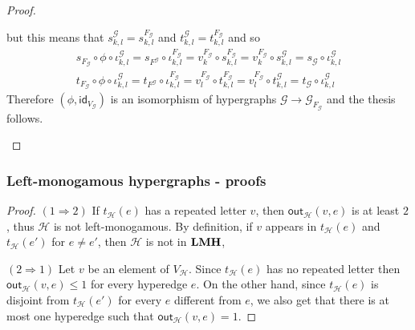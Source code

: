 \documentclass[3p]{elsarticle}
\newcommand{\outd}[1]{\mathsf{out}_{\mathcal{#1}}}
\newcommand{\catname}[1]{\textbf{\textup{#1}}}
\newcommand{\lmo}{\catname{LMH}}
\newcommand{\id}[1]{\mathsf{id}_{#1}}
\theoremstyle{remark}
\theoremstyle{definition}
\begin{document}
\begin{proof}
\begin{itemize}
	but this means that $s^{\mathcal{G}}_{k,l}= s^{F_{\mathcal{G}}}_{k,l}$ and 
$t^{\mathcal{G}}_{k,l}= t^{F_{\mathcal{G}}}_{k,l}$ and so
\begin{gather*}
s_{F_{\mathcal{G}}}\circ \phi \circ \iota^{\mathcal{G}}_{k,l}=  s_{F^{\mathcal{G}}}\circ \iota^{F_{\mathcal{G}}}_{k,l}= v^{F_{\mathcal{G}}}_k \circ s^{F_{\mathcal{G}}}_{k,l} = v^{F_{\mathcal{G}}}_k \circ  s^{\mathcal{G}}_{k,l} = s_{\mathcal{G}}\circ \iota^{\mathcal{G}}_{k,l}\\
t_{F_{\mathcal{G}}}\circ \phi \circ \iota^{\mathcal{G}}_{k,l}=  t_{F^{\mathcal{G}}}\circ \iota^{F_{\mathcal{G}}}_{k,l}= v^{F_{\mathcal{G}}}_l \circ t^{F_{\mathcal{G}}}_{k,l} = v^{F_{\mathcal{G}}}_l \circ  t^{\mathcal{G}}_{k,l} = t_{\mathcal{G}}\circ \iota^{\mathcal{G}}_{k,l}
\end{gather*}
Therefore $(\phi,\id{V_\mathcal{G}})$ is an isomorphism of hypergraphs $\mathcal{G}\to \mathcal{G}_{F_{\mathcal{G}}}$ and the thesis follows. \qedhere
	\end{itemize}
\end{proof}

\subsubsection{Left-monogamous hypergraphs - proofs}

\elem*
\begin{proof}\label{proof:elem}
	$(1\Rightarrow 2)$ If $t_{\mathcal{H}}(e)$ has a repeated letter $v$, then $\outd{H}(v,e)$ is at least $2$, thus $\mathcal{H}$ is not left-monogamous.  By definition, if $v$ appears in $t_{\mathcal{H}}(e)$ and $t_{\mathcal{H}}(e')$ for $e\neq e'$, then $\mathcal{H}$ is not in $\lmo$,
	\smallskip \noindent 	
	
	$(2\Rightarrow 1)$ Let $v$ be an element of $V_{\mathcal{H}}$. Since $t_{\mathcal{H}}(e)$ has no repeated letter then $\outd{H}(v,e)\leq 1$ for every hyperedge $e$. On the other hand, since $t_{\mathcal{H}}(e)$ is disjoint from $t_{\mathcal{H}}(e')$ for every $e$ different from $e$, we also get that there is at most one hyperedge such that  $\outd{H}(v,e) = 1$.
\end{proof}
\end{document}
